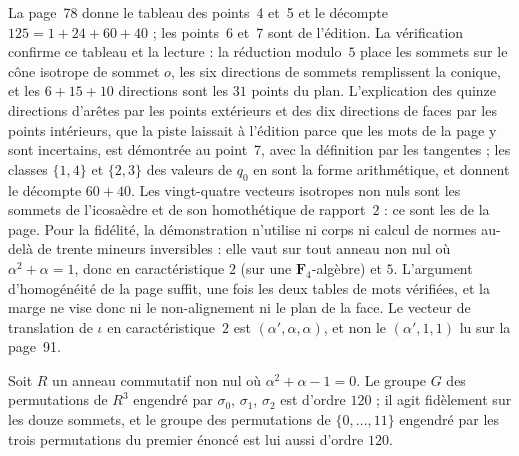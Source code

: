 \begin{remarque}
La page~78 donne le tableau des points~4 et~5 et le décompte $125 = 1 + 24 + 60 + 40$ ; les points~6 et~7 sont de l'édition. La vérification confirme ce tableau et la lecture : la réduction modulo~$5$ place les sommets sur le cône isotrope de sommet $o$, les six directions de sommets remplissent la conique, et les $6 + 15 + 10$ directions sont les $31$ points du plan. L'explication des quinze directions d'arêtes par les points extérieurs et des dix directions de faces par les points intérieurs, que la piste laissait à l'édition parce que les mots de la page y sont incertains, est démontrée au point~7, avec la définition par les tangentes ; les classes $\{1, 4\}$ et $\{2, 3\}$ des valeurs de $q_0$ en sont la forme arithmétique, et donnent le décompte $60 + 40$. Les vingt-quatre vecteurs isotropes non nuls sont les sommets de l'icosaèdre et de son homothétique de rapport~$2$ : ce sont les  de la page. Pour la fidélité, la démonstration n'utilise ni corps ni calcul de normes au-delà de trente mineurs inversibles : elle vaut sur tout anneau non nul où $\alpha^2 + \alpha = 1$, donc en caractéristique $2$ (sur une $\mathbf F_4$-algèbre) et $5$. L'argument d'homogénéité de la page suffit, une fois les deux tables de mots vérifiées, et la marge  ne vise donc ni le non-alignement ni le plan de la face. Le vecteur de translation de $\iota$ en caractéristique~$2$ est $(\alpha', \alpha, \alpha)$, et non le $(\alpha', 1, 1)$ lu sur la page~91.
\end{remarque}

\begin{enonce}
Soit $R$ un anneau commutatif non nul où $\alpha^2 + \alpha - 1 = 0$. Le groupe $G$ des permutations de $R^3$ engendré par $\sigma_0$, $\sigma_1$, $\sigma_2$ est d'ordre $120$ ; il agit fidèlement sur les douze sommets, et le groupe des permutations de $\{0, \dots, 11\}$ engendré par les trois permutations du premier énoncé est lui aussi d'ordre $120$.
\end{enonce}

